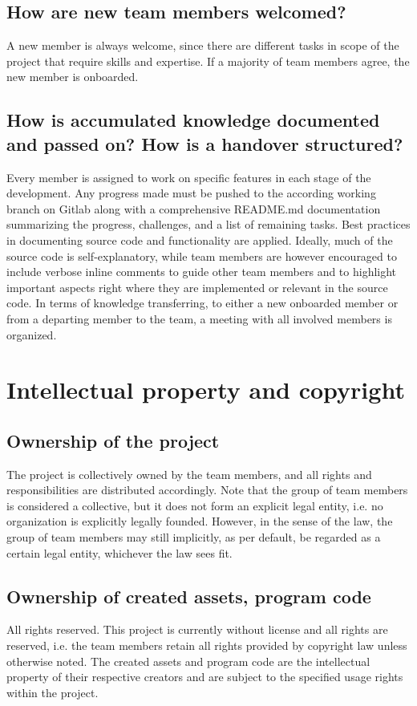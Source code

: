 \subsection{How are new team members welcomed?}
A new member is always welcome, since there are different tasks in scope of the project that require skills and expertise.
If a majority of team members agree, the new member is onboarded.
\subsection{How is accumulated knowledge documented and passed on? How is a handover structured?}
Every member is assigned to work on specific features in each stage of the development.
Any progress made must be pushed to the according working branch on Gitlab along with a comprehensive README.md documentation summarizing the progress, challenges, and a list of remaining tasks.
Best practices in documenting source code and functionality are applied.
Ideally, much of the source code is self-explanatory, while team members are however encouraged to include verbose inline comments to guide other team members and to highlight important aspects right where they are implemented or relevant in the source code.
In terms of knowledge transferring, to either a new onboarded member or from a departing member to the team, a meeting with all involved members is organized.

\section{Intellectual property and copyright}
\subsection{Ownership of the project}
The project is collectively owned by the team members, and all rights and responsibilities are distributed accordingly.
Note that the group of team members is considered a collective, but it does not form an explicit legal entity, i.e. no organization is explicitly legally founded.
However, in the sense of the law, the group of team members may still implicitly, as per default, be regarded as a certain legal entity, whichever the law sees fit.
\subsection{Ownership of created assets, program code}
All rights reserved.
This project is currently without license and all rights are reserved, i.e. the team members retain all rights provided by copyright law unless otherwise noted.
The created assets and program code are the intellectual property of their respective creators and are subject to the specified usage rights within the project.
